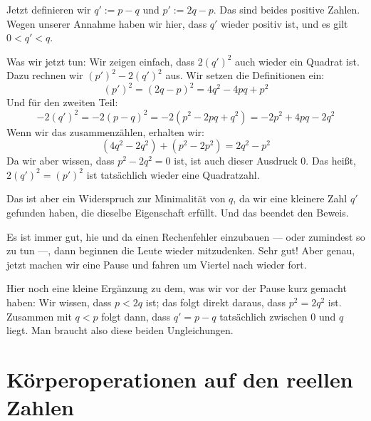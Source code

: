 \begin{spoken-clean}[00:34:33 - 00:35:55]
Jetzt definieren wir $q' := p - q$ und $p' := 2q - p$. Das sind beides positive Zahlen. Wegen unserer Annahme haben wir hier, dass $q'$ wieder positiv ist, und es gilt $0 < q' < q$.

Was wir jetzt tun: Wir zeigen einfach, dass $2(q')^2$ auch wieder ein Quadrat ist. Dazu rechnen wir $(p')^2 - 2(q')^2$ aus. Wir setzen die Definitionen ein:
\[ (p')^2 = (2q - p)^2 = 4q^2 - 4pq + p^2 \]
Und für den zweiten Teil:
\[ -2(q')^2 = -2(p - q)^2 = -2(p^2 - 2pq + q^2) = -2p^2 + 4pq - 2q^2 \]
Wenn wir das zusammenzählen, erhalten wir:
\[ (4q^2 - 2q^2) + (p^2 - 2p^2) = 2q^2 - p^2 \]
Da wir aber wissen, dass $p^2 - 2q^2 = 0$ ist, ist auch dieser Ausdruck $0$. Das heißt, $2(q')^2 = (p')^2$ ist tatsächlich wieder eine Quadratzahl.
\end{spoken-clean}

\begin{spoken-clean}[00:35:55 - 00:37:08]
Das ist aber ein Widerspruch zur Minimalität von $q$, da wir eine kleinere Zahl $q'$ gefunden haben, die dieselbe Eigenschaft erfüllt. Und das beendet den Beweis.

Es ist immer gut, hie und da einen Rechenfehler einzubauen --- oder zumindest so zu tun ---, dann beginnen die Leute wieder mitzudenken. Sehr gut! Aber genau, jetzt machen wir eine Pause und fahren um Viertel nach wieder fort.

Hier noch eine kleine Ergänzung zu dem, was wir vor der Pause kurz gemacht haben: Wir wissen, dass $p < 2q$ ist; das folgt direkt daraus, dass $p^2 = 2q^2$ ist. Zusammen mit $q < p$ folgt dann, dass $q' = p - q$ tatsächlich zwischen $0$ und $q$ liegt. Man braucht also diese beiden Ungleichungen.
\end{spoken-clean}

\section{Körperoperationen auf den reellen Zahlen}

